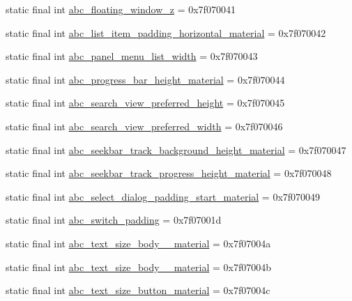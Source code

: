 \begin{CompactItemize}
static final int \hyperlink{classandroid_1_1support_1_1v4_1_1_r_1_1dimen_acdb02de20ee606a2e0de66515461b85}{abc\_\-floating\_\-window\_\-z} = 0x7f070041
\item 
static final int \hyperlink{classandroid_1_1support_1_1v4_1_1_r_1_1dimen_579bb13d29fff47b71a2f7c5a75e67b8}{abc\_\-list\_\-item\_\-padding\_\-horizontal\_\-material} = 0x7f070042
\item 
static final int \hyperlink{classandroid_1_1support_1_1v4_1_1_r_1_1dimen_697cc314ee0f8b7f70bede0ac1c43620}{abc\_\-panel\_\-menu\_\-list\_\-width} = 0x7f070043
\item 
static final int \hyperlink{classandroid_1_1support_1_1v4_1_1_r_1_1dimen_c6b225388d014c4b5aab72b2a1e52a8e}{abc\_\-progress\_\-bar\_\-height\_\-material} = 0x7f070044
\item 
static final int \hyperlink{classandroid_1_1support_1_1v4_1_1_r_1_1dimen_4021b817c0607e70b82bb6adb3d276f3}{abc\_\-search\_\-view\_\-preferred\_\-height} = 0x7f070045
\item 
static final int \hyperlink{classandroid_1_1support_1_1v4_1_1_r_1_1dimen_9a158859d15cc4fd66da73de15cb7387}{abc\_\-search\_\-view\_\-preferred\_\-width} = 0x7f070046
\item 
static final int \hyperlink{classandroid_1_1support_1_1v4_1_1_r_1_1dimen_49193064f59eccb127bd2ffc7b3ffd00}{abc\_\-seekbar\_\-track\_\-background\_\-height\_\-material} = 0x7f070047
\item 
static final int \hyperlink{classandroid_1_1support_1_1v4_1_1_r_1_1dimen_fb634357fffee763a390665a121f347a}{abc\_\-seekbar\_\-track\_\-progress\_\-height\_\-material} = 0x7f070048
\item 
static final int \hyperlink{classandroid_1_1support_1_1v4_1_1_r_1_1dimen_661f54717d45923ec2acc1c08aba0ae3}{abc\_\-select\_\-dialog\_\-padding\_\-start\_\-material} = 0x7f070049
\item 
static final int \hyperlink{classandroid_1_1support_1_1v4_1_1_r_1_1dimen_f47cd1a017d331d9b6c6f73cf1b266ae}{abc\_\-switch\_\-padding} = 0x7f07001d
\item 
static final int \hyperlink{classandroid_1_1support_1_1v4_1_1_r_1_1dimen_28278a090c5779ef154afe06e6c7d2c0}{abc\_\-text\_\-size\_\-body\_\_\-material} = 0x7f07004a
\item 
static final int \hyperlink{classandroid_1_1support_1_1v4_1_1_r_1_1dimen_26ad2b0b756dbd6484817080703e39ec}{abc\_\-text\_\-size\_\-body\_\_\-material} = 0x7f07004b
\item 
static final int \hyperlink{classandroid_1_1support_1_1v4_1_1_r_1_1dimen_2b36d05db0d376e42853eba61c1966a2}{abc\_\-text\_\-size\_\-button\_\-material} = 0x7f07004c

\end{CompactItemize}
